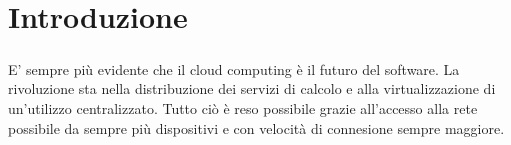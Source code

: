 \chapter{Introduzione}

\paragraph{}
 E' sempre più evidente che il cloud computing è il futuro del software. La rivoluzione sta nella distribuzione dei servizi di calcolo e alla virtualizzazione di un'utilizzo centralizzato. Tutto ciò è reso possibile grazie all'accesso alla rete possibile da sempre più dispositivi e con velocità di connesione sempre maggiore.